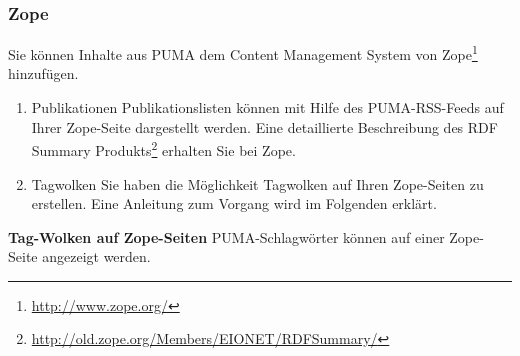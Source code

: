 \subsubsection{Zope}
Sie können Inhalte aus PUMA dem Content Management System von Zope\footnote{\url{http://www.zope.org/}} hinzufügen.
\begin{enumerate}
    \item Publikationen\newline
    Publikationslisten können mit Hilfe des PUMA-RSS-Feeds auf Ihrer Zope-Seite dargestellt werden. Eine detaillierte Beschreibung des RDF Summary Produkts\footnote{\url{http://old.zope.org/Members/EIONET/RDFSummary/}} erhalten Sie bei Zope.
    \item Tagwolken\newline
    Sie haben die Möglichkeit Tagwolken auf Ihren Zope-Seiten zu  erstellen. Eine Anleitung zum Vorgang wird im Folgenden erklärt.
\end{enumerate}
\textbf{Tag-Wolken auf Zope-Seiten} \newline
PUMA-Schlagwörter können auf einer Zope-Seite angezeigt werden. 
